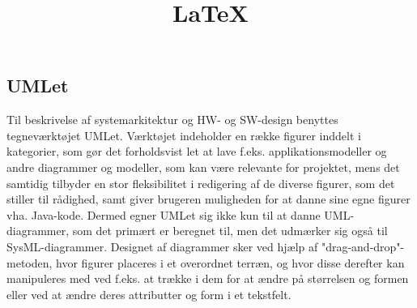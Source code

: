 \documentclass[12pt]{article}
\title{\LaTeX}
\date{}
\begin{document}
	\subsection{UMLet}
	Til beskrivelse af systemarkitektur og HW- og SW-design benyttes tegneværktøjet UMLet. Værktøjet indeholder en række figurer inddelt i kategorier, som gør det forholdsvist let at lave f.eks. applikationsmodeller og andre diagrammer og modeller, som kan være relevante for projektet, mens det samtidig tilbyder en stor fleksibilitet i redigering af de diverse figurer, som det stiller til rådighed, samt giver brugeren muligheden for at danne sine egne figurer vha. Java-kode. Dermed egner UMLet sig ikke kun til at danne UML-diagrammer, som det primært er beregnet til, men det udmærker sig også til SysML-diagrammer. Designet af diagrammer sker ved hjælp af "drag-and-drop"-metoden, hvor figurer placeres i et overordnet terræn, og hvor disse derefter kan manipuleres med ved f.eks. at trække i dem for at ændre på størrelsen og formen eller ved at ændre deres attributter og form i et tekstfelt.
\end{document}
